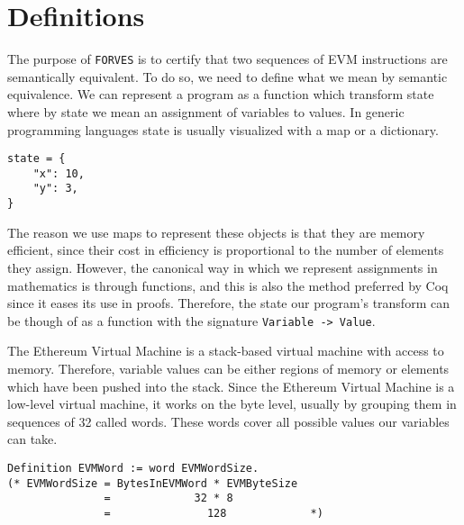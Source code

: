 \chapter{Definitions}
\label{cap:definitions}



The purpose of \texttt{FORVES} is to certify that two sequences of EVM instructions are 
semantically equivalent. To do so, we need to define what we mean by semantic equivalence.
We can represent a program as a function which transform state where by state we mean an assignment of 
variables to values. In generic programming languages state is usually visualized with a map or a
dictionary.

\begin{verbatim}
state = {
    "x": 10,
    "y": 3,
}
\end{verbatim}

The reason we use maps to represent these objects is that they are memory efficient, since their 
cost in efficiency is proportional to the number of elements they assign. However, the canonical 
way in which we represent assignments in mathematics is through functions, and this is also the 
method preferred by Coq since it eases its use in proofs. Therefore, the state our program's 
transform can be though of as a function with the signature \texttt{Variable -> Value}.

The Ethereum Virtual Machine is a stack-based virtual machine with access to memory. Therefore,
variable values can be either regions of memory or elements which have been pushed into the stack. 
Since the Ethereum Virtual Machine is a low-level virtual machine, it works on the byte level, usually
by grouping them in sequences of 32 called words. These words cover all possible values our variables 
can take.

\begin{verbatim}
Definition EVMWord := word EVMWordSize. 
(* EVMWordSize = BytesInEVMWord * EVMByteSize
               =             32 * 8
               =               128             *)
\end{verbatim}

